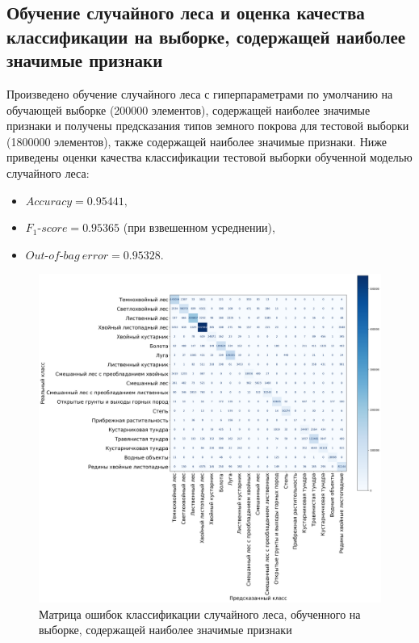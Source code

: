 \documentclass[14pt, a4paper, oneside]{extarticle}
\begin{document}
\subsection{Обучение случайного леса и оценка качества классификации на выборке, содержащей наиболее значимые признаки}
Произведено обучение случайного леса с гиперпараметрами по умолчанию на обучающей выборке (200000 элементов), содержащей наиболее значимые признаки и получены предсказания типов земного покрова для тестовой выборки (1800000 элементов), также содержащей наиболее значимые признаки. Ниже приведены оценки качества классификации тестовой выборки обученной моделью случайного леса:
\begin{itemize}
    \item[] $Accuracy = 0.95441,$
    \item[] $F_1\mbox{-}score = 0.95365$ (при взвешенном усреднении),
    \item[] $Out\mbox{-}of\mbox{-}bag\ error = 0.95328.$
\end{itemize}

\begin{figure}[H]
    \caption{Матрица ошибок классификации случайного леса, обученного на выборке, содержащей наиболее значимые признаки}
    \centering
    \includegraphics[scale=0.33]{confusion-matrix-5}
\end{figure}
\end{document}

